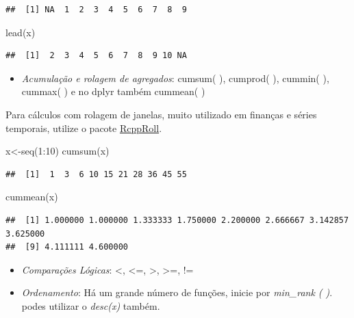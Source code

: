 \documentclass[
]{article}
\newenvironment{Shaded}{\begin{snugshade}}{\end{snugshade}}
\newcommand{\DecValTok}[1]{\textcolor[rgb]{0.00,0.00,0.81}{#1}}
\newcommand{\FunctionTok}[1]{\textcolor[rgb]{0.00,0.00,0.00}{#1}}
\newcommand{\NormalTok}[1]{#1}
\newcommand{\OtherTok}[1]{\textcolor[rgb]{0.56,0.35,0.01}{#1}}
\newcommand{\SpecialCharTok}[1]{\textcolor[rgb]{0.00,0.00,0.00}{#1}}
\providecommand{\tightlist}{%
  \setlength{\itemsep}{0pt}\setlength{\parskip}{0pt}}
\begin{document}
\begin{verbatim}
##  [1] NA  1  2  3  4  5  6  7  8  9
\end{verbatim}

\begin{Shaded}
\begin{Highlighting}[]
\FunctionTok{lead}\NormalTok{(x)}
\end{Highlighting}
\end{Shaded}

\begin{verbatim}
##  [1]  2  3  4  5  6  7  8  9 10 NA
\end{verbatim}

\begin{itemize}
\tightlist
\item
  \emph{Acumulação e rolagem de agregados}: cumsum( ), cumprod( ),
  cummin( ), cummax( ) e no dplyr também cummean( )
\end{itemize}

Para cálculos com rolagem de janelas, muito utilizado em finanças e
séries temporais, utilize o pacote
\href{https://www.rdocumentation.org/packages/RcppRoll/versions/0.2.2/topics/RcppRoll}{RcppRoll}.

\begin{Shaded}
\begin{Highlighting}[]
\NormalTok{x}\OtherTok{\textless{}{-}}\FunctionTok{seq}\NormalTok{(}\DecValTok{1}\SpecialCharTok{:}\DecValTok{10}\NormalTok{)}
\FunctionTok{cumsum}\NormalTok{(x)}
\end{Highlighting}
\end{Shaded}

\begin{verbatim}
##  [1]  1  3  6 10 15 21 28 36 45 55
\end{verbatim}

\begin{Shaded}
\begin{Highlighting}[]
\FunctionTok{cummean}\NormalTok{(x)}
\end{Highlighting}
\end{Shaded}

\begin{verbatim}
##  [1] 1.000000 1.000000 1.333333 1.750000 2.200000 2.666667 3.142857 3.625000
##  [9] 4.111111 4.600000
\end{verbatim}

\begin{itemize}
\item
  \emph{Comparações Lógicas}: \textless, \textless=, \textgreater,
  \textgreater=, !=
\item
  \emph{Ordenamento}: Há um grande número de funções, inicie por
  \emph{min\_rank ( )}. podes utilizar o \emph{desc(x)} também.
\end{itemize}
\end{document}
